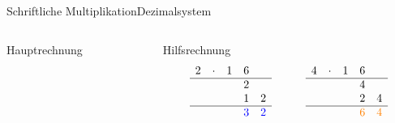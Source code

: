\documentclass[xelatex,aspectratio=169]{beamer}
\begin{document}
\begin{frame}[t]{Schriftliche Multiplikation}{Dezimalsystem}
\begin{columns}
\begin{column}{0.33\textwidth}
\begin{block}{Hauptrechnung}
      \end{block}
    \end{column}
    \begin{column}{0.67\textwidth}
      \begin{block}{Hilfsrechnung}
        \[
          \begin{matrix}
            2 & \cdot & 1 & 6                                         \\
            \hline
              &       &   & 2                   &                     \\
              &       &   & 1                   & 2                   \\
            \hline
              &       &   & \textcolor{blue}{3} & \textcolor{blue}{2} \\
          \end{matrix} \qquad\qquad \begin{matrix}
            4 & \cdot & 1 & 6                                             \\
            \hline
              &       &   & 4                     &                       \\
              &       &   & 2                     & 4                     \\
            \hline
              &       &   & \textcolor{orange}{6} & \textcolor{orange}{4} \\
          \end{matrix}
        \]
      \end{block}
    \end{column}
  \end{columns}
\end{frame}
\end{document}
